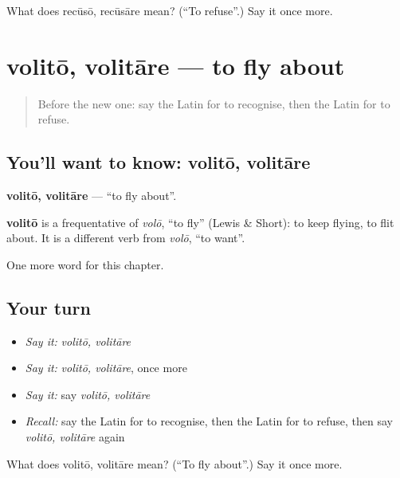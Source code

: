 \begin{tcolorbox}[breakable,colback=teal!4,colframe=teal!35!black,title={Before you move on}]
What does recūsō, recūsāre mean? (\textquotedblleft{}To refuse\textquotedblright{}.) Say it once more.
\end{tcolorbox}
\section[volitō, volitāre]{volitō, volitāre — to fly about}

\label{lesson:LA-C200-volito}



\begin{quote}
Before the new one: say the Latin for to recognise, then the Latin for to refuse.
\end{quote}

\subsection*{You'll want to know: volitō, volitāre}
\textbf{volitō, volitāre} — \textquotedblleft{}to fly about\textquotedblright{}.

\begin{cousinweb}
\textbf{volitō} is a frequentative of \emph{volō}, \textquotedblleft{}to fly\textquotedblright{} (Lewis \& Short): to keep flying, to flit about. It is a different verb from \emph{volō}, \textquotedblleft{}to want\textquotedblright{}.
\end{cousinweb}

\begin{grammarlens}[title={What you've built}]
One more word for this chapter.
\end{grammarlens}

\subsection*{Your turn}
\begin{itemize}
\raggedright
  \item \emph{Say it:} \emph{volitō, volitāre}
  \item \emph{Say it:} \emph{volitō, volitāre}, once more
  \item \emph{Say it:} say \emph{volitō, volitāre}
  \item \emph{Recall:} say the Latin for to recognise, then the Latin for to refuse, then say \emph{volitō, volitāre} again
\end{itemize}

\begin{tcolorbox}[breakable,colback=teal!4,colframe=teal!35!black,title={Before you move on}]
What does volitō, volitāre mean? (\textquotedblleft{}To fly about\textquotedblright{}.) Say it once more.
\end{tcolorbox}
